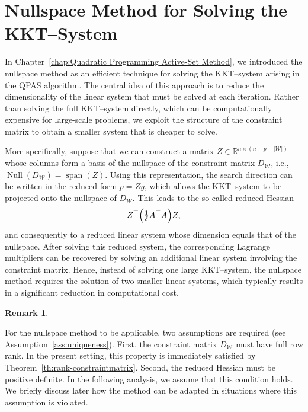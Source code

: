 \documentclass{book}
\theoremstyle{definition}
\newtheorem{remark}[theorem]{Remark}
\newcounter{algorithm_}
\numberwithin{algorithm_}{chapter}
\begin{document}
{\newpage



\section{Nullspace Method for Solving the KKT--System}
\label{sec:nullspace_method}

In Chapter~\ref{chap:Quadratic Programming Active-Set Method}, we introduced the nullspace method as an efficient technique for solving the KKT--system arising in the QPAS algorithm. The central idea of this approach is to reduce the dimensionality of the linear system that must be solved at each iteration. Rather than solving the full KKT--system directly, which can be computationally expensive for large-scale problems, we exploit the structure of the constraint matrix to obtain a smaller system that is cheaper to solve.

More specifically, suppose that we can construct a matrix $Z \in \mathbb{R}^{n \times (n - p - |\mathcal{W}|)}$
whose columns form a basis of the nullspace of the constraint matrix \(D_{\mathcal{W}}\), i.e., $\operatorname{Null}(D_{\mathcal{W}}) = \operatorname{span}(Z)$.
Using this representation, the search direction can be written in the reduced form \(p = Z y\), which allows the KKT--system to be projected onto the nullspace of \(D_{\mathcal{W}}\). This leads to the so-called reduced Hessian
\[
Z^\top \Bigl(\tfrac{1}{\delta} A^\top A \Bigr) Z,
\]
and consequently to a reduced linear system whose dimension equals that of the nullspace. After solving this reduced system, the corresponding Lagrange multipliers can be recovered by solving an additional linear system involving the constraint matrix. Hence, instead of solving one large KKT--system, the nullspace method requires the solution of two smaller linear systems, which typically results in a significant reduction in computational cost.

\bigskip

\begin{remark} \label{rem:assumption_nullspace_method}

For the nullspace method to be applicable, two assumptions are required (see Assumption~\ref{ass:uniqueness}). First, the constraint matrix \(D_{\mathcal{W}}\) must have full row rank. In the present setting, this property is immediately satisfied by Theorem~\ref{th:rank-constraintmatrix}. Second, the reduced Hessian
must be positive definite. In the following analysis, we assume that this condition holds. We briefly discuss later how the method can be adapted in situations where this assumption is violated.


\end{remark}}
\end{document}
